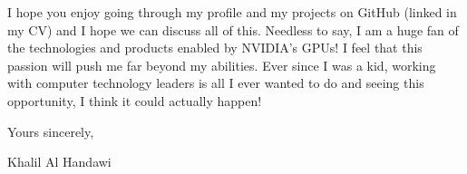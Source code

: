 \documentclass[12pt]{article} %
\begin{document}
\medskip %

I hope you enjoy going through my profile and my projects on GitHub (linked in my CV) and I hope we can discuss all of this. Needless to say, I am a huge fan of the technologies and products enabled by NVIDIA's GPUs! I feel that this passion will push me far beyond my abilities. Ever since I was a kid, working with computer technology leaders is all I ever wanted to do and seeing this opportunity, I think it could actually happen!





\medskip %

Yours sincerely,

\medskip %

Khalil Al Handawi

\medskip %

\end{document}
